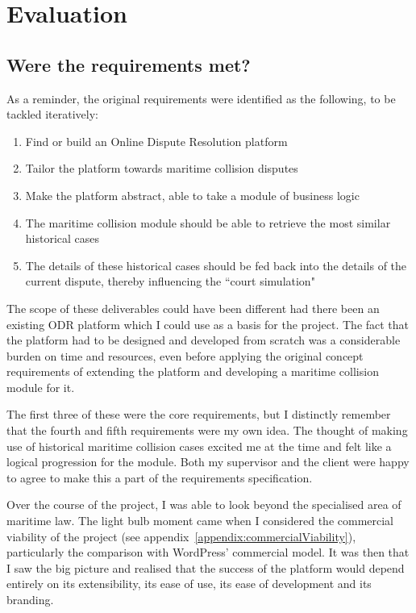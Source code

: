 \chapter{Evaluation}

\section{Were the requirements met?}

As a reminder, the original requirements were identified as the following, to be tackled iteratively:

\begin{enumerate}

    \item Find or build an Online Dispute Resolution platform
    
    \item Tailor the platform towards maritime collision disputes

    \item Make the platform abstract, able to take a module of business logic
    
    \item The maritime collision module should be able to retrieve the most similar historical cases

    \item The details of these historical cases should be fed back into the details of the current dispute, thereby influencing the ``court simulation"

\end{enumerate}

The scope of these deliverables could have been different had there been an existing ODR platform which I could use as a basis for the project. The fact that the platform had to be designed and developed from scratch was a considerable burden on time and resources, even before applying the original concept requirements of extending the platform and developing a maritime collision module for it.

The first three of these were the core requirements, but I distinctly remember that the fourth and fifth requirements were my own idea. The thought of making use of historical maritime collision cases excited me at the time and felt like a logical progression for the module. Both my supervisor and the client were happy to agree to make this a part of the requirements specification.

Over the course of the project, I was able to look beyond the specialised area of maritime law. The light bulb moment came when I considered the commercial viability of the project (see appendix~\ref{appendix:commercialViability}), particularly the comparison with WordPress' commercial model. It was then that I saw the big picture and realised that the success of the platform would depend entirely on its extensibility, its ease of use, its ease of development and its branding.

